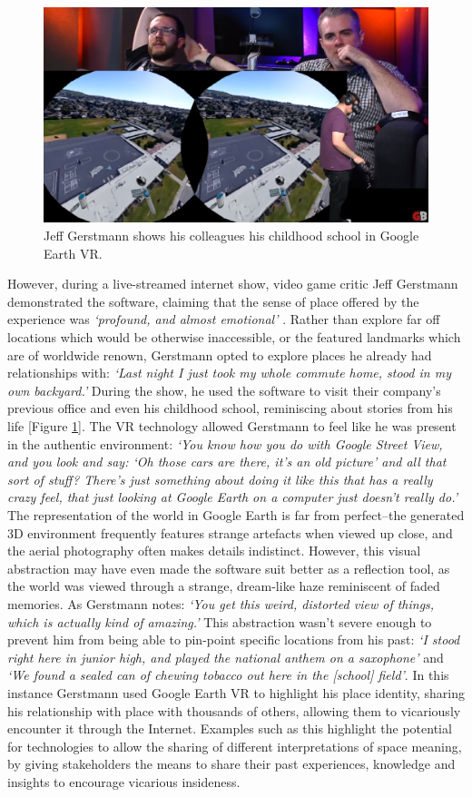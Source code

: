 \begin{figure}
  \centering
  \includegraphics[width=0.8\columnwidth]{images/chapter02/googleEarth.PNG}
  \caption[Jeff Gerstmann showing Google Earth VR]{Jeff Gerstmann shows his colleagues his childhood school in Google Earth VR.}
  \label{fig:googleEarth}
\end{figure}

However, during a live-streamed internet show, video game critic Jeff Gerstmann demonstrated the software, claiming that the sense of place offered by the experience was \textit{`profound, and almost emotional'} \citep{Gerstmann2016}. Rather than explore far off locations which would be otherwise inaccessible, or the featured landmarks which are of worldwide renown, Gerstmann opted to explore places he already had relationships with: \textit{`Last night I just took my whole commute home, stood in my own backyard.'} During the show, he used the software to visit their company's previous office and even his childhood school, reminiscing about stories from his life [Figure \ref{fig:googleEarth}]. The VR technology allowed Gerstmann to feel like he was present in the authentic environment: \textit{`You know how you do with Google Street View, and you look and say: `Oh those cars are there, it's an old picture' and all that sort of stuff? There's just something about doing it like this that has a really crazy feel, that just looking at Google Earth on a computer just doesn't really do.'} The representation of the world in Google Earth is far from perfect--the generated 3D environment frequently features strange artefacts when viewed up close, and the aerial photography often makes details indistinct. However, this visual abstraction may have even made the software suit better as a reflection tool, as the world was viewed through a strange, dream-like haze reminiscent of faded memories. As Gerstmann notes: \textit{`You get this weird, distorted view of things, which is actually kind of amazing.'} This abstraction wasn't severe enough to prevent him from being able to pin-point specific locations from his past: \textit{`I stood right here in junior high, and played the national anthem on a saxophone'} and \textit{`We found a sealed can of chewing tobacco out here in the [school] field'}. In this instance Gerstmann used Google Earth VR to highlight his place identity, sharing his relationship with place with thousands of others, allowing them to vicariously encounter it through the Internet. Examples such as this highlight the potential for technologies to allow the sharing of different interpretations of space meaning, by giving stakeholders the means to share their past experiences, knowledge and insights to encourage vicarious insideness.

